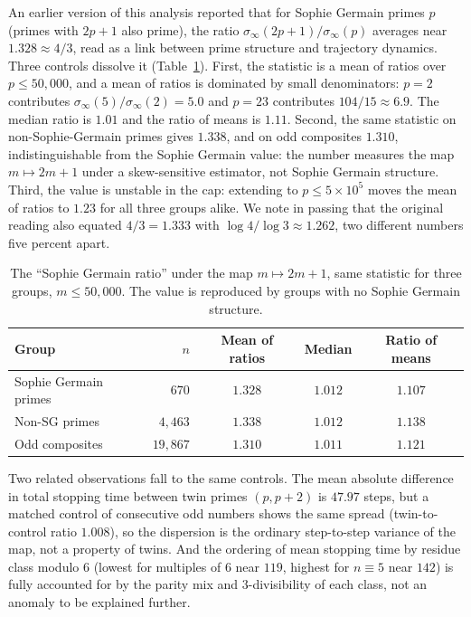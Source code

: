 \documentclass[11pt]{amsart}
\begin{document}
An earlier version of this analysis reported that for Sophie Germain primes $p$ (primes with $2p+1$ also prime), the ratio $\sigma_\infty(2p+1)/\sigma_\infty(p)$ averages near $1.328 \approx 4/3$, read as a link between prime structure and trajectory dynamics. Three controls dissolve it (Table~\ref{tab:sg}). First, the statistic is a mean of ratios over $p \le 50{,}000$, and a mean of ratios is dominated by small denominators: $p = 2$ contributes $\sigma_\infty(5)/\sigma_\infty(2) = 5.0$ and $p = 23$ contributes $104/15 \approx 6.9$. The median ratio is $1.01$ and the ratio of means is $1.11$. Second, the same statistic on non-Sophie-Germain primes gives $1.338$, and on odd composites $1.310$, indistinguishable from the Sophie Germain value: the number measures the map $m \mapsto 2m+1$ under a skew-sensitive estimator, not Sophie Germain structure. Third, the value is unstable in the cap: extending to $p \le 5 \times 10^5$ moves the mean of ratios to $1.23$ for all three groups alike. We note in passing that the original reading also equated $4/3 = 1.333$ with $\log 4 / \log 3 \approx 1.262$, two different numbers five percent apart.

\begin{table}[ht]
\centering
\caption{The ``Sophie Germain ratio'' under the map $m \mapsto 2m+1$, same statistic for three groups, $m \le 50{,}000$. The value is reproduced by groups with no Sophie Germain structure.}
\label{tab:sg}
\small
\begin{tabular}{lrccc}
\toprule
Group & $n$ & Mean of ratios & Median & Ratio of means \\
\midrule
Sophie Germain primes & $670$ & $1.328$ & $1.012$ & $1.107$ \\
Non-SG primes & $4{,}463$ & $1.338$ & $1.012$ & $1.138$ \\
Odd composites & $19{,}867$ & $1.310$ & $1.011$ & $1.121$ \\
\bottomrule
\end{tabular}
\end{table}

Two related observations fall to the same controls. The mean absolute difference in total stopping time between twin primes $(p, p+2)$ is $47.97$ steps, but a matched control of consecutive odd numbers shows the same spread (twin-to-control ratio $1.008$), so the dispersion is the ordinary step-to-step variance of the map, not a property of twins. And the ordering of mean stopping time by residue class modulo $6$ (lowest for multiples of $6$ near $119$, highest for $n \equiv 5$ near $142$) is fully accounted for by the parity mix and $3$-divisibility of each class, not an anomaly to be explained further.
\end{document}
